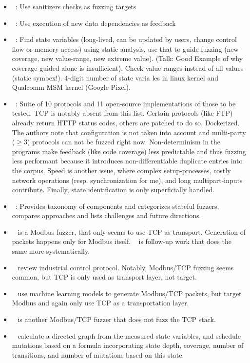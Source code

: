 \documentclass{article}
\let\savedCite=\cite
\renewcommand{\cite}{\unskip~\savedCite}
\begin{document}
\begin{multicols}{2}
\begin{itemize}
    \item {}\cite{ParmeSan}: Use sanitizers checks as fuzzing targets
    \item {}\cite{DDFuzz}: Use execution of new data dependencies as feedback
    \item {}\cite{StateFuzz}: Find state variables (long-lived, can be updated by users, change control flow or memory access) using static analysis, use that to guide fuzzing (new coverage, new value-range, new extreme value). (Talk: Good Example of why coverage-guided alone is insufficient). Check value ranges instead of all values (static symbex!). 4-digit number of state varia les in linux kernel and Qualcomm MSM kernel (Google Pixel).
    \item {}\cite{ProFuzzBench}: Suite of 10 protocols and 11 open-source implementations of those to be tested. TCP is notably absent from this list. Certain protocols (like FTP) already return HTTP status codes, others are patched to do so. Dockerized. The authors note that configuration is not taken into account and multi-party ($\geq 3$) protocols can not be fuzzed right now. Non-determinism in the programs make feedback (like code coverage) less predictable and thus fuzzing less performant because it introduces non-differentiable duplicate entries into the corpus. Speed is another issue, where complex setup-processes, costly network operations (resp. synchronization for me), and long multipart-inputs contribute. Finally, state identification is only superficially handled.
    \item {}\cite{StatefulReview}: Provides taxonomy of components and categorizes stateful fuzzers, compares approaches and lists challenges and future directions.
    \item {}\cite{ModbusTCP} is a Modbus fuzzer, that only seems to use TCP as transport. Generation of packets happens only for Modbus itself. \cite{MTFStorm} is follow-up work that does the same more systematically.
    \item {}\cite{IndustrialReview} review industrial control protocol. Notably, Modbus/TCP fuzzing seems common, but TCP is only used as transport layer, not target.
    \item {}\cite{MTA} use machine learning models to generate Modbus/TCP packets, but target Modbus and again only use TCP as a transportation layer.
    \item {}\cite{AnotherModbusTCP} is another Modbus/TCP fuzzer that does not fuzz the TCP stack.
    \item {}\cite{StateMachine} calculate a directed graph from the measured state variables, and schedule mutations based on a formula incorporating state depth, coverage, number of transitions, and number of mutations based on this state.
  \end{itemize}


\end{multicols}
\end{document}
